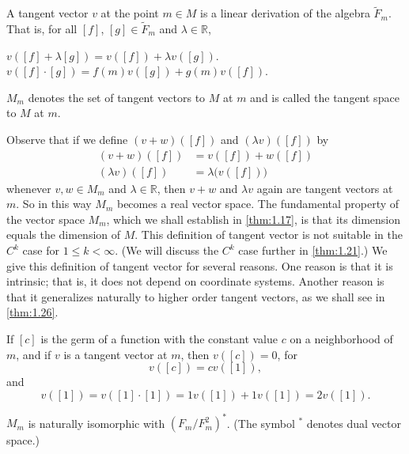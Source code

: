 \begin{definition}\label{thm:1.14}
	A tangent vector  $ v $ at the point  $ m \in M $ is a linear derivation
	of the algebra  $ \widetilde{F}_m $. That is, for all  $ [f] $,
	$ [g] \in \widetilde{F}_m $ and  $ \lambda \in \mathbb{R} $, 
	\begin{enumerate}
		$v([f]+\lambda[g])=v([f])+\lambda v([g]).$
		 $v([f]\cdot[g])=f(m)v([g])+g(m)v([f]).$
	\end{enumerate}

	$ M_m $ denotes the set of tangent vectors to  $ M $ at  $ m $ and
	is called the tangent space to  $ M $ at  $ m $.
\end{definition}
Observe that if we define  $ (v + w)([f]) $ and  $ (\lambda v)([f]) $ by 
\begin{equation}
	\label{eq:1.14:1}
	\begin{aligned}(v+w)([f])&=v([f])+w([f])\\ (\lambda v)([f])&=\lambda\big(v([f])\big)\end{aligned}
\end{equation}
whenever $v, w \in M_m$ and $\lambda \in \mathbb{R}$, then $v + w$ and $\lambda v$ again are tangent
vectors at $m$. So in this way $M_m$ becomes a real vector space.
The fundamental property of the vector space $M_m$,
which we shall establish in \ref{thm:1.17}, is that its dimension
equals the dimension of $M$. This definition of tangent vector
is not suitable in the $C^{k}$ case for $1 \leq k < \infty$.
(We will discuss the $C^{k}$ case further in \ref{thm:1.21}.)
We give this definition of tangent vector for several reasons.
One reason is that it is intrinsic; that is, it does not depend on
coordinate systems. Another reason is that it generalizes naturally
to higher order tangent vectors, as we shall see in \ref{thm:1.26}.

\label{thm:1.15}
If $[c]$ is the germ of a function with the constant value $c$ on a
neighborhood of $m$, and if $v$ is a tangent vector at $m$, then $v([c]) = 0$, for
\[
	v([c])=c v([1]),
\]
and 
\[
	v([1])=v([1]\cdot[1])=1v([1])+1v([1])=2v([1]).
\]
\begin{lemma}\label{thm:1.16}
	$M_{m}$ is naturally isomorphic with $(F_{m}/F_{m}^{2})^{*}$. (The symbol ${}^{*}$ denotes dual vector space.)
\end{lemma}


